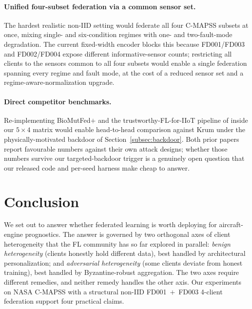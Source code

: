 \documentclass[a4paper,fleqn,doubleblind]{cas-sc}
\begin{document}
\paragraph{Unified four-subset federation via a common sensor set.}
The hardest realistic non-IID setting would federate all four
C-MAPSS subsets at once, mixing single- and six-condition regimes
with one- and two-fault-mode degradation. The current fixed-width
encoder blocks this because FD001/FD003 and FD002/FD004 expose
different informative-sensor counts; restricting all clients to the
sensors common to all four subsets would enable a single federation
spanning every regime and fault mode, at the cost of a reduced
sensor set and a regime-aware-normalization upgrade.

\paragraph{Direct competitor benchmarks.}
Re-implementing BioMutFed$+$ \citep{Tallat2026BioMutFedPlus} and
the trustworthy-FL-for-IIoT pipeline of
\citet{Li2026TrustworthyFLIIoT} inside our $5 \times 4$ matrix
would enable head-to-head comparison against Krum under the
physically-motivated backdoor of Section~\ref{subsec:backdoor}.
Both prior papers report favourable numbers against their own
attack designs; whether those numbers survive our targeted-backdoor
trigger is a genuinely open question that our released code and
per-seed harness make cheap to answer.



\section{Conclusion}
\label{sec:conclusion}

We set out to answer whether federated learning is worth deploying
for aircraft-engine prognostics. The answer is governed by two
orthogonal axes of client heterogeneity that the FL community has
so far explored in parallel: \emph{benign heterogeneity} (clients
honestly hold different data), best handled by architectural
personalization; and \emph{adversarial heterogeneity} (some clients
deviate from honest training), best handled by Byzantine-robust
aggregation. The two axes require different remedies, and neither
remedy handles the other axis. Our experiments on NASA C-MAPSS
with a structural non-IID FD001~$+$~FD003 4-client federation
support four practical claims.
\end{document}
